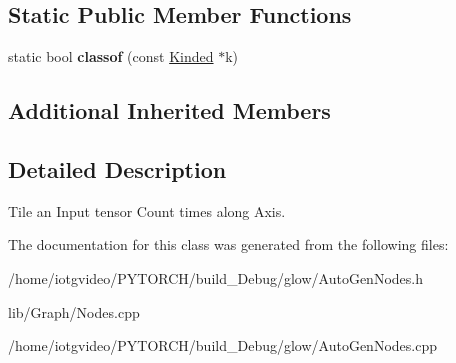 \subsection*{Static Public Member Functions}
\begin{DoxyCompactItemize}
\item 
\mbox{\label{classglow_1_1_tile_node_a2f5baf800fe3246368981b00ac42daad}} 
static bool {\bfseries classof} (const \hyperlink{classglow_1_1_kinded}{Kinded} $\ast$k)
\end{DoxyCompactItemize}
\subsection*{Additional Inherited Members}


\subsection{Detailed Description}
Tile an Input tensor Count times along Axis. 

The documentation for this class was generated from the following files\+:\begin{DoxyCompactItemize}
\item 
/home/iotgvideo/\+P\+Y\+T\+O\+R\+C\+H/build\+\_\+\+Debug/glow/Auto\+Gen\+Nodes.\+h\item 
lib/\+Graph/Nodes.\+cpp\item 
/home/iotgvideo/\+P\+Y\+T\+O\+R\+C\+H/build\+\_\+\+Debug/glow/Auto\+Gen\+Nodes.\+cpp\end{DoxyCompactItemize}
